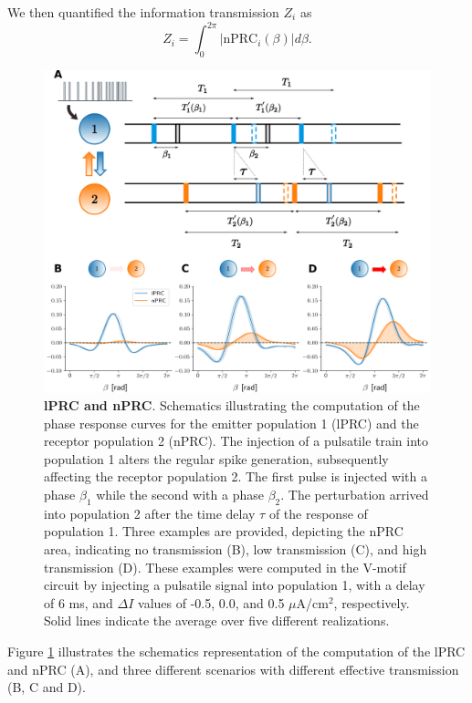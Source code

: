 \documentclass[../main.tex]{subfiles}
\begin{document}
We then quantified the information transmission $Z_i$ as
\begin{equation}
        Z_i = \displaystyle\int_{0}^{2\pi} |\text{nPRC}_i(\beta) | d\beta.
\end{equation}

\begin{figure}[!htb]
    \centering
    \includegraphics[width=\textwidth]{chapter2/figures/fast_stimulation.png}
    \caption{\textbf{lPRC and nPRC}.
    Schematics illustrating the computation of the phase response curves for the emitter population 1 (lPRC) and the receptor population 2 (nPRC).
    The injection of a pulsatile train into population 1 alters the regular spike generation, subsequently affecting the receptor population 2.
    The first pulse is injected with a phase $\beta_1$ while the second with a phase $\beta_2$.
    The perturbation arrived into population 2 after the time delay $\tau$ of the response of population 1.
    Three examples are provided, depicting the nPRC area, indicating no transmission (B), low transmission (C), and high transmission (D).
    These examples were computed in the V-motif circuit by
    injecting a pulsatile signal into population 1, with a delay of 6 ms, and $\Delta I$ values of
    -0.5, 0.0, and 0.5 $\mu$A/cm$^2$, respectively.
    Solid lines indicate the average over five different realizations.}
    \label{fig:fast-stimulation}
\end{figure}
Figure \ref{fig:fast-stimulation} illustrates the schematics representation of the computation of the lPRC and nPRC (A), and three different scenarios with different effective transmission (B, C and D).
\end{document}
